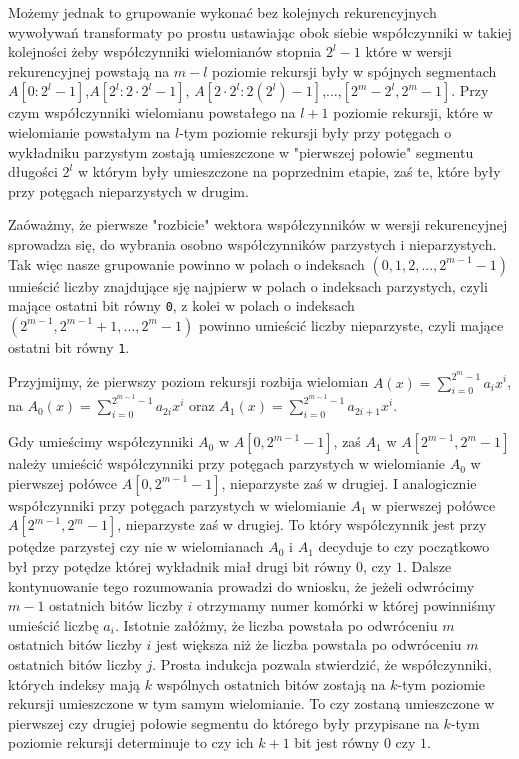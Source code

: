 \documentclass{article}
\begin{document}
Możemy jednak to grupowanie wykonać bez kolejnych rekurencyjnych wywoływań transformaty po prostu ustawiając obok siebie współczynniki w takiej kolejności 
żeby współczynniki wielomianów stopnia $2^l-1$ które w wersji rekurencyjnej powstają na $m-l$ poziomie rekursji
były w spójnych segmentach $A[0:2^l-1]$,$A[2^l:2 \cdot 2^l-1]$,
$A[2 \cdot 2^l:2(2^l)-1]$,...,$[2^m-2^l,2^m-1]$. Przy czym współczynniki wielomianu powstałego na
$l+1$ poziomie rekursji, które w wielomianie powstałym na $l$-tym poziomie rekursji były przy 
potęgach o wykładniku parzystym zostają umieszczone w "pierwszej połowie" segmentu 
długości $2^l$ w którym były umieszczone na poprzednim etapie, zaś te, które były przy 
potęgach nieparzystych w drugim.

Zaóważmy, że pierwsze "rozbicie" wektora współczynników w wersji rekurencyjnej sprowadza się,
do wybrania osobno współczynników parzystych i nieparzystych. Tak więc nasze grupowanie
powinno w polach o indeksach $(0,1,2,...,2^{m-1}-1)$ umieścić liczby znajdujące sję najpierw 
w polach o indeksach parzystych, czyli mające ostatni bit równy \texttt{0}, z kolei 
w polach o indeksach $(2^{m-1},2^{m-1}+1,...,2^m-1)$ powinno umieścić liczby nieparzyste, czyli
mające ostatni bit równy \texttt{1}. 

Przyjmijmy, że pierwszy poziom rekursji rozbija wielomian
$A(x)=\sum_{i=0}^{2^m-1}a_ix^i$, na $A_0(x)=\sum_{i=0}^{2^{m-1}-1}a_{2i}x^{i}$ oraz
$A_1(x)=\sum_{i=0}^{2^{m-1}-1}a_{2i+1}x^{i}$. 

Gdy umieścimy współczynniki $A_0$ w $A[0,2^{m-1}-1]$, zaś $A_1$ w $A[2^{m-1},2^m-1]$ należy umieścić współczynniki przy potęgach parzystych w wielomianie $A_0$ w pierwszej połówce 
$A[0,2^{m-1}-1]$, nieparzyste zaś w drugiej. I analogicznie współczynniki przy potęgach 
parzystych w wielomianie $A_1$ w pierwszej połówce 
$A[2^{m-1},2^{m}-1]$, nieparzyste zaś w drugiej. To który współczynnik jest przy potędze 
parzystej czy nie w wielomianach $A_0$ i $A_1$ decyduje to czy początkowo był przy potędze
której wykładnik miał drugi bit równy $0$, czy $1$. Dalsze kontynuowanie tego rozumowania 
prowadzi do wniosku, że jeżeli odwrócimy $m-1$ ostatnich bitów liczby $i$ otrzymamy numer komórki
w której powinniśmy umieścić liczbę $a_i$. Istotnie załóżmy, że liczba powstała po odwróceniu $m$ ostatnich bitów liczby $i$ jest większa niż że liczba powstała po odwróceniu $m$ ostatnich bitów liczby $j$. Prosta indukcja pozwala stwierdzić, że współczynniki, których indeksy mają $k$ 
wspólnych ostatnich 
bitów zostają na $k$-tym poziomie rekursji umieszczone w tym samym wielomianie. 
To czy zostaną umieszczone w pierwszej czy drugiej połowie segmentu do którego były przypisane 
na $k$-tym poziomie rekursji determinuje to czy ich $k+1$ bit jest równy $0$ czy $1$.
\end{document}
